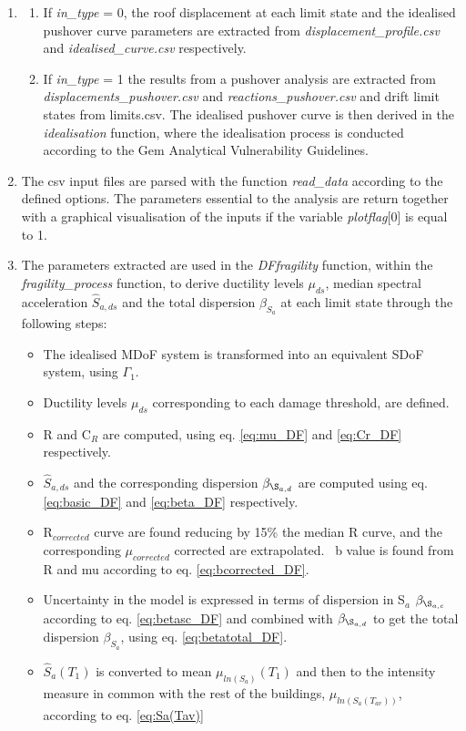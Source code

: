 \begin{enumerate}
\item 
\begin{enumerate}
\item If \textit{in\_type} = 0, the roof displacement at each limit state and the idealised pushover curve parameters are extracted from \textit{displacement\_profile.csv} and \textit{idealised\_curve.csv} respectively.

\item If \textit{in\_type} = 1 the results from a pushover analysis are extracted from \textit{displacements\_pushover.csv} and \textit{reactions\_pushover.csv} and drift limit states from {limits.csv}. The idealised pushover curve is then derived in the \textit{idealisation} function, where the idealisation process is conducted according to the Gem Analytical Vulnerability Guidelines.	\end{enumerate}

\item The csv input files are parsed with the function \textit{read\_data} according to the defined options. The parameters essential to the analysis are return together with a graphical visualisation of the inputs if the variable \textit{plotflag}[0] is equal to 1.

\item The parameters extracted are used in the \textit{DFfragility} function, within the \textit{fragility\_process} function, to derive ductility levels $\mu_{ds}$, median spectral acceleration $\hat{S}_{a,ds}$ and the total dispersion $\beta_{S_a}$ at each limit state through the following steps:
\begin{itemize}
\item The idealised MDoF system is transformed into an equivalent SDoF system, using $\Gamma_1$.
\item Ductility levels $\mu_{ds}$ corresponding to each damage threshold, are defined.
\item R and C$_R$ are computed, using eq. \ref{eq:mu_DF} and \ref{eq:Cr_DF} respectively.
\item $\hat{S}_{a,ds}$ and the corresponding dispersion  $\beta_{\S_{a, d}}$ are computed using eq. \ref{eq:basic_DF} and \ref{eq:beta_DF} respectively.
\item R$_{corrected}$ curve are found reducing by 15\% the median R curve, and the corresponding $\mu_{corrected}$ corrected are extrapolated.
\ b value is found from R and mu according to eq. \ref{eq:bcorrected_DF}.
\item Uncertainty in the model is expressed in terms of dispersion in S$_a$ $\beta_{\S_{a, c}}$ according to eq. \ref{eq:betasc_DF} and combined with $\beta_{\S_{a, d}}$ to get the total dispersion $\beta_{S_a}$, using eq. \ref{eq:betatotal_DF}.
\item $\hat{S}_a(T_1)$ is converted to mean $\mu_{ln(S_a)}(T_1)$ and then to the intensity measure in common with the rest of the buildings, $\mu_{ln(S_a(T_{av}))}$, according to eq. \ref{eq:Sa(Tav)}
\end{itemize}


\end{enumerate}
